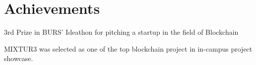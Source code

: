 \section{Achievements}
    \begin{itemize}[leftmargin=0.15in, label={}]
	\small{\item{
   3rd Prize in BURS’ Ideathon for pitching a startup in the field of Blockchain
	}}
    \end{itemize}
    \begin{itemize}[leftmargin=0.15in, label={}]
	\small{\item{
   MIXTUR3 was selected as one of the top blockchain project in in-campus project showcase.
	}}
    \end{itemize}
    
    
